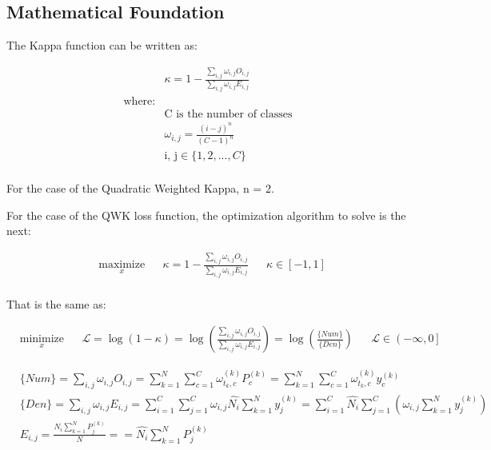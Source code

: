 \documentclass{IOS-Book-Article}
\begin{document}
\subsection{Mathematical Foundation}

The Kappa function can be written as:

\begin{equation*}
\begin{aligned}
&\kappa = 1 - \frac{ \sum_{i,j} \omega_{i,j} O_{i,j} }
{\sum_{i,j} \omega_{i,j} E_{i,j}}\\
\text{where:}\\
&\text{C is the number of classes}\\
&\omega_{i,j} = \frac{(i-j)^n}{(C - 1)^n}\\
&\text{i, j} \in \{ 1, 2, ..., C\}\\
\end{aligned}
\end{equation*}

For the case of the Quadratic Weighted Kappa, n = 2.

For the case of the QWK loss function, the optimization algorithm to solve is the next:

\begin{equation*}
\begin{aligned}
& \underset{x}{\text{maximize}}
& & \kappa = 1 - \frac{ \sum_{i,j} \omega_{i,j} O_{i,j} }
{\sum_{i,j} \omega_{i,j} E_{i,j}} & & \kappa \in [-1,1]\\
\end{aligned}
\end{equation*}

That is the same as:

\begin{equation*}
\begin{aligned}
& \underset{x}{\text{minimize}}
& & \mathcal{L} = \log{\left( 1 - \kappa \right)} = \log{\left( \frac{ \sum_{i,j} \omega_{i,j} O_{i,j} }{\sum_{i,j} \omega_{i,j} E_{i,j}} \right) } = \log{\left(\frac{\{Num\}}{\{Den\}}\right)} & & \mathcal{L} \in \left(-\infty,0\right]
\end{aligned}
\end{equation*}

\begin{equation*}
\begin{aligned}
& \{ Num \} = \sum_{i,j} \omega_{i,j} O_{i,j} = \sum_{k=1}^N \sum_{c=1}^C \omega_{t_k,c}^{(k)} P_c^{(k)} = \sum_{k=1}^N \sum_{c=1}^C \omega_{t_k,c}^{(k)} y_c^{(k)}\\
&\{ Den \} = \sum_{i,j} \omega_{i,j} E_{i,j} = \sum_{i=1}^C \sum_{j=1}^C \omega_{i,j} \hat{N_i} \sum_{k=1}^N y_j^{(k)} = \sum_{i=1}^C \hat{N_i} \sum_{j=1}^C \left( \omega_{i,j} \sum_{k=1}^N y_j^{(k)}\right)\\
& E_{i,j} = \frac{N_i \sum_{k=1}^N P_j^{(k)}}{N} = = \hat{N_i} \sum_{k=1}^N P_j^{(k)}
\end{aligned}
\end{equation*}
\end{document}
